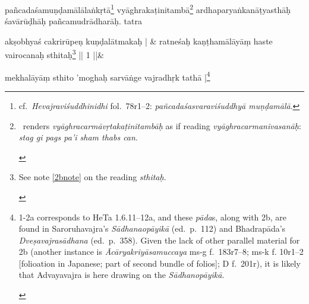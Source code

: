 \documentclass[naipra.tex]{subfiles}
\begin{document}
\begin{sanskrit}
{	
}pañcadaśamuṇḍamālālaṅkṛtā\footnote{
	cf.\ \emph{Hevajraviśuddhinidhi} fol.\ 78r1–2: \emph{pañcadaśasvaraviśuddhyā muṇḍamālā}.
} vyāghrakaṭinitambā\footnote{
	\begin{english}%
		\TIB\ renders \emph{vyāghracarmāvṛtakaṭinitambāḥ} as if reading \emph{vyāghracarmanivasanāḥ}: \emph{stag gi pags pa'i sham thabs can}.
	\end{english}
} ardhaparyaṅkanāṭyasthāḥ śavārūḍhāḥ pañcamudrādharāḥ. tatra\Emdash
\pend


\medskip\versequote
akṣobhyaś cakrirūpeṇ kuṇḍalātmakaḥ | &
ratneśaḥ kaṇṭhamālāyāṃ haste vairocanaḥ sthitaḥ\footnote{
	\begin{english}%
		See note \ref{2bnote} on the reading \emph{sthitaḥ}.
	\end{english}
} || 1 ||\&


\medskip\versequote
mekhalāyāṃ sthito 'moghaḥ sarvāṅge vajradhṛk tathā |\footnote{
	\begin{english}%
		1-2a corresponds to HeTa 1.6.11–12a, and these \emph{pāda}s, along with 2b, are found in Saroruhavajra's \emph{Sādhanaopāyikā} (ed.\ p.\ 112) and Bhadrapāda's \emph{Dveṣavajrasādhana} (ed.\ p.\ 358).
		Given the lack of other parallel material for 2b (another instance is \emph{Ācāryakriyāsamuccaya} ms-g f.\ 183r7–8; ms-k f. 10r1–2 [folioation in Japanese; part of second bundle of folios]; D f.\ 201r), it is likely that Advayavajra is here drawing on the \emph{Sādhanopāyikā}.
	

\end{english}}
\end{sanskrit}
\end{document}
